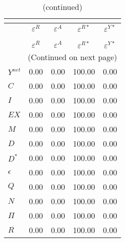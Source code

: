  
\begin{center}
\begin{longtable}{lcccc} 
\caption{VARIANCE DECOMPOSITION (in percent)}\\
 \label{Table:th_var_decomp_uncond}\\
\toprule 
$          $	 & 	 $    \varepsilon^{R}$	 & 	 $    \varepsilon^{A}$	 & 	 $   \varepsilon^{R*}$	 & 	 $   \varepsilon^{Y*}$\\
\midrule \endfirsthead 
\caption{(continued)}\\
 \toprule \\ 
$          $	 & 	 $    \varepsilon^{R}$	 & 	 $    \varepsilon^{A}$	 & 	 $   \varepsilon^{R*}$	 & 	 $   \varepsilon^{Y*}$\\
\midrule \endhead 
\midrule \multicolumn{5}{r}{(Continued on next page)} \\ \bottomrule \endfoot 
\bottomrule \endlastfoot 
$Y^{net}   $	 & 	                0.00	 & 	                0.00	 & 	              100.00	 & 	                0.00 \\ 
$C         $	 & 	                0.00	 & 	                0.00	 & 	              100.00	 & 	                0.00 \\ 
$I         $	 & 	                0.00	 & 	                0.00	 & 	              100.00	 & 	                0.00 \\ 
$EX        $	 & 	                0.00	 & 	                0.00	 & 	              100.00	 & 	                0.00 \\ 
$M         $	 & 	                0.00	 & 	                0.00	 & 	              100.00	 & 	                0.00 \\ 
$D         $	 & 	                0.00	 & 	                0.00	 & 	              100.00	 & 	                0.00 \\ 
$D^{*}     $	 & 	                0.00	 & 	                0.00	 & 	              100.00	 & 	                0.00 \\ 
$\epsilon  $	 & 	                0.00	 & 	                0.00	 & 	              100.00	 & 	                0.00 \\ 
$Q         $	 & 	                0.00	 & 	                0.00	 & 	              100.00	 & 	                0.00 \\ 
$N         $	 & 	                0.00	 & 	                0.00	 & 	              100.00	 & 	                0.00 \\ 
$\Pi       $	 & 	                0.00	 & 	                0.00	 & 	              100.00	 & 	                0.00 \\ 
$R         $	 & 	                0.00	 & 	                0.00	 & 	              100.00	 & 	                0.00 \\ 
\end{longtable}
 \end{center}
